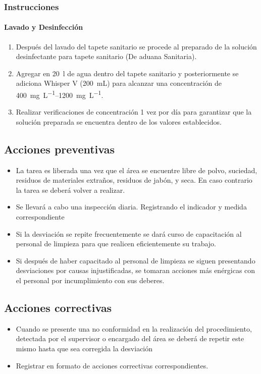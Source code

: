 \subsubsection{Instrucciones}

\paragraph{Lavado y Desinfección}

\begin{enumerate}
	\item Después del lavado del tapete sanitario se procede al preparado de la solución desinfectante para tapete sanitario (De aduana Sanitaria).
	\item Agregar en \qty{20}{\litre} de agua dentro del tapete sanitario y posteriormente se adiciona Whisper V (\qty{200}{\milli\liter}) para alcanzar una concentración de \qtyrange{400}{1200}{\milli\gram\per\liter}.
	\item Realizar verificaciones de concentración 1 vez por día para garantizar que la solución preparada se encuentra dentro de los valores establecidos.
\end{enumerate}

\subsection{Acciones preventivas}

\begin{itemize}
	\item La tarea es liberada una vez que el área se encuentre libre de polvo, suciedad, residuos de materiales extraños, residuos de jabón, y seca. En caso contrario la tarea se deberá volver a realizar.
	\item Se llevará a cabo una inspección diaria. Registrando el indicador y medida correspondiente
	\item Si la desviación se repite frecuentemente se dará curso de capacitación al personal de limpieza para que realicen eficientemente su trabajo.
	\item Si después de haber capacitado al personal de limpieza se siguen presentando desviaciones por causas injustificadas, se tomaran acciones más enérgicas con el personal por incumplimiento con sus deberes.
\end{itemize}

\subsection{Acciones correctivas}
\begin{itemize}
	\item Cuando se presente una no conformidad en la realización del procedimiento, detectada por el supervisor o encargado del área se deberá de repetir este mismo hasta que sea corregida la desviación
	\item Registrar en formato de acciones correctivas correspondientes.
\end{itemize}

